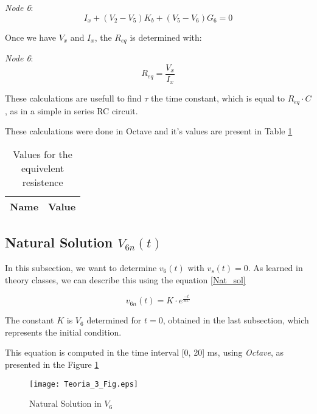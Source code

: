 \textit{Node 6}:
\begin{equation}
  I_{x} + (V_{2} - V_{5})K_{b} + (V_{5} - V_{6})G_{6} = 0
\end{equation}

Once we have $V_x$ and $I_x$, the $R_{eq}$ is determined with:


\textit{Node 6}:
\begin{equation}
  R_{eq} = \frac{V_x}{I_x}
\end{equation}

These calculations are usefull to find $\tau$ the time constant, which is equal to $R_{eq} \cdot C$, as in a simple in series RC circuit.

These calculations were done in Octave and it's values are present in Table \ref{tabReq}

\begin{table}[!ht]
  \centering
  \begin{tabular}{|l|r|}
    \hline    
    {\bf Name} & {\bf Value} \\ \hline
    
  \end{tabular}
  \caption{Values for the equivelent resistence}
  \label{tabReq}
\end{table}


\subsection{Natural Solution $V_{6n}(t)$}
\label{subsec:Nat_Sol_theory}

In this subsection, we want to determine $v_6 (t)$ with $v_s(t) = 0$. As learned in theory classes, we can describe this using the equation \ref{Nat_sol}

\begin{equation}
  v_{6n}(t) = K \cdot e^{\frac{-t}{RC}}
  \label{eq:Nat_sol}
\end{equation}

The constant $K$ is $V_6$ determined for $t=0$, obtained in the last subsection, which represents the initial condition.

This equation is computed in the time interval [0, 20] ms, using \textit{Octave}, as presented in the Figure \ref{plot3}

\begin{figure}[h]
\centering
\caption{Natural Solution in $V_6$}
\texttt{[image: Teoria\_3\_Fig.eps]}
\label{plot3}
\end{figure}

\newpage


